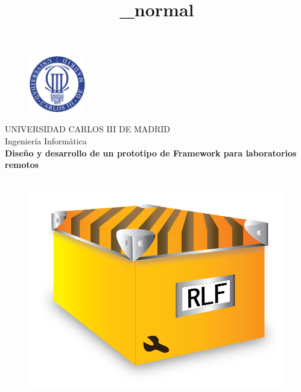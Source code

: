 
\title{\RLF_normal} 
\author{\Carlos}
\date{\Fecha}

\begin{titlepage}

\begin{figure}[ht]
	\begin{center}
	\vspace{0.5cm}
	\includegraphics[width=2.5cm]{images/logo_uc3m.png}
	\vspace{-1cm}
	\end{center}
\end{figure}

\begin{center}
	UNIVERSIDAD CARLOS III DE MADRID \\
	Ingeniería Informática\\
	\vspace{3cm} {\huge \textbf{Diseño y desarrollo de un prototipo de 
	Framework para laboratorios remotos}}\\
	\\
	
	\begin{figure}[ht]
		\begin{center}
			\vspace{1.5cm}
			\includegraphics[scale=0.2]{images/logo_rlf.png}
			

\end{center}
\end{figure}
\end{center}
\end{titlepage}

